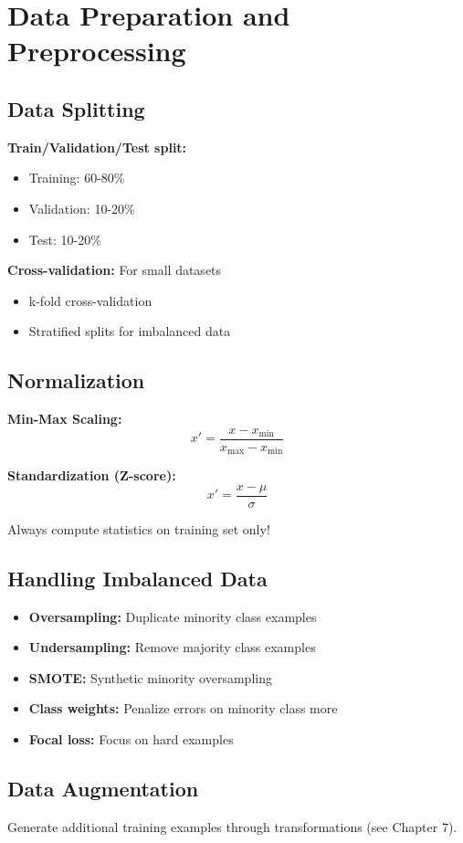 
\section{Data Preparation and Preprocessing}
\label{sec:data-preparation}

\subsection{Data Splitting}

\textbf{Train/Validation/Test split:}
\begin{itemize}
    \item Training: 60-80\%
    \item Validation: 10-20\%
    \item Test: 10-20\%
\end{itemize}

\textbf{Cross-validation:} For small datasets
\begin{itemize}
    \item k-fold cross-validation
    \item Stratified splits for imbalanced data
\end{itemize}

\subsection{Normalization}

\textbf{Min-Max Scaling:}
\begin{equation}
x' = \frac{x - x_{\min}}{x_{\max} - x_{\min}}
\end{equation}

\textbf{Standardization (Z-score):}
\begin{equation}
x' = \frac{x - \mu}{\sigma}
\end{equation}

Always compute statistics on training set only!

\subsection{Handling Imbalanced Data}

\begin{itemize}
    \item \textbf{Oversampling:} Duplicate minority class examples
    \item \textbf{Undersampling:} Remove majority class examples
    \item \textbf{SMOTE:} Synthetic minority oversampling
    \item \textbf{Class weights:} Penalize errors on minority class more
    \item \textbf{Focal loss:} Focus on hard examples
\end{itemize}

\subsection{Data Augmentation}

Generate additional training examples through transformations (see Chapter 7).

